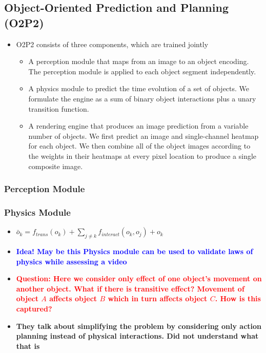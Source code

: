 \documentclass{article}
\begin{document}
    \subsection{Object-Oriented Prediction and Planning (O2P2)}\label{subsec:Reasoning_about_Physical_Interactions_with_Object_Oriented_Prediction_and_Planning_(O2P2):o2p2}
    \begin{itemize}
        \item O2P2 consists of three components, which are trained jointly
        \begin{itemize}
            \item A perception module that maps from an image to an object encoding.
            The perception module is applied to each object segment independently.
            \item A physics module to predict the time evolution of a set of objects.
            We formulate the engine as a sum of binary object interactions plus a unary transition function.
            \item A rendering engine that produces an image prediction from a variable number of objects.
            We first predict an image and single-channel heatmap for each object.
            We then combine all of the object images according to the weights in their heatmaps at every pixel location to produce a single composite image.
        \end{itemize}
    \end{itemize}

    \subsubsection{Perception Module}\label{subsubsec:Reasoning_about_Physical_Interactions_with_Object_Oriented_Prediction_and_Planning_(O2P2):perception-module}

    \subsubsection{Physics Module}\label{subsubsec:Reasoning_about_Physical_Interactions_with_Object_Oriented_Prediction_and_Planning_(O2P2):physics-module}
    \begin{itemize}
        \item $\bar{o}_k = f_{trans}(o_k) + \sum_{j \neq k} f_{interact}(o_k,o_j) + o_k$
        \item \textcolor{blue}{\textbf{Idea!
        May be this Physics module can be used to validate laws of physics while assessing a video}}
        \item \textcolor{red}{\textbf{Question: Here we consider only effect of one object's movement on another object.
        What if there is transitive effect?
        Movement of object  $A$ affects object $B$ which in turn affects object $C$.
        How is this captured?}}
        \item \textbf{They talk about simplifying the problem by considering only action planning instead of physical interactions.
        Did not understand what that is}
    \end{itemize}
\end{document}
